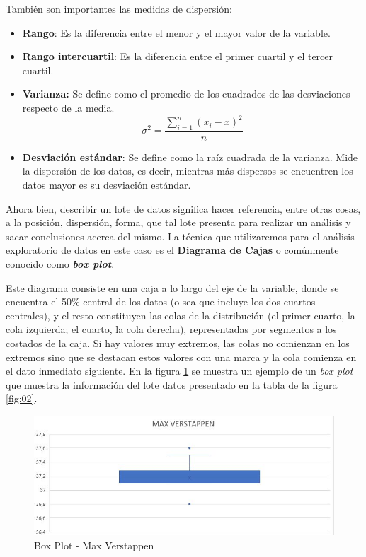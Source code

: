 \noindent También son importantes las medidas de dispersión:
\begin{itemize}
	\item \textbf{Rango}: Es la diferencia entre el menor y el mayor valor de la variable.
	
	\item \textbf{Rango intercuartil}: Es la diferencia entre el primer cuartil y el tercer cuartil. 
	
	\item \textbf{Varianza:} Se define como el promedio de los cuadrados de las desviaciones respecto de la media. $$\sigma^{2} = \frac{\sum_{i=1}^{n} (x_{i} - \overline{x})^{2}}{n}$$
	
	\item \textbf{Desviación estándar}: Se define como la raíz cuadrada de la varianza. Mide la dispersión de los datos, es decir, mientras más dispersos se encuentren los datos mayor es su desviación estándar. 
\end{itemize}

Ahora bien, describir un lote de datos significa hacer referencia, entre otras cosas, a la posición, dispersión, forma, que tal lote presenta para realizar un análisis y sacar conclusiones acerca del mismo. La técnica que utilizaremos para el análisis exploratorio de datos en este caso es el \textbf{Diagrama de Cajas} o comúnmente conocido como \textbf{\textit{box plot}}. 

Este diagrama consiste en una caja a lo largo del eje de la variable, donde se encuentra el 50\% central de los datos (o sea que incluye los dos cuartos centrales), y el resto constituyen las colas de la distribución (el primer cuarto, la cola izquierda; el cuarto, la cola derecha), representadas por segmentos a los costados de la caja. Si hay valores muy extremos, las colas no comienzan en los extremos sino que se destacan estos valores con una marca y la cola comienza en el dato inmediato siguiente. En la figura \ref{fig:04} se muestra un ejemplo de un \textit{box plot} que muestra la información del lote datos presentado en la tabla de la figura \ref{fig:02}.

\begin{figure}[h!]
	\caption{Box Plot - Max Verstappen}
	\label{fig:04}
	\includegraphics[width=0.6\linewidth]{Trabajos/01/Anexos/04}
\end{figure}

